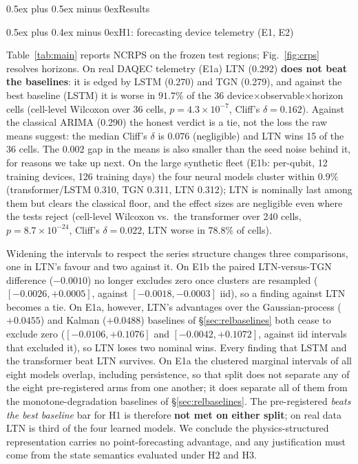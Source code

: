 \documentclass[journal]{IEEEtran}
\makeatletter
\def\section{\@startsection{section}{1}{\z@}{1.8ex plus 1ex minus 0.75ex}%
{0.5ex plus 0.5ex minus 0ex}{\normalfont\normalsize\centering\scshape}}
\def\subsection{\@startsection{subsection}{2}{\z@}{1.8ex plus 1ex minus 0.75ex}%
{0.5ex plus 0.4ex minus 0ex}{\normalfont\normalsize\itshape}}
\makeatother
\begin{document}
\section{Results}\label{sec:results}

\subsection{H1: forecasting device telemetry (E1, E2)}\label{sec:results-h1}

Table~\ref{tab:main} reports NCRPS on the frozen test regions; Fig.~\ref{fig:crps}
resolves horizons. On real DAQEC telemetry (E1a) LTN (0.292) \textbf{does not beat
the baselines}: it is edged by LSTM (0.270) and TGN (0.279), and against the best
baseline (LSTM) it is worse in $91.7\%$ of the 36
device$\times$observable$\times$horizon cells (cell-level Wilcoxon over 36 cells,
$p = 4.3\times10^{-7}$, Cliff's $\delta = 0.162$). Against the classical
ARIMA (0.290) the honest verdict is a tie, not the loss the raw means suggest: the
median Cliff's $\delta$ is $0.076$ (negligible) and LTN wins 15 of the 36 cells. The
$0.002$ gap in the means is also smaller than the seed noise behind it, for reasons
we take up next. On the large synthetic fleet (E1b: per-qubit, 12 training
devices, 126 training days) the four neural models cluster within $0.9\%$
(transformer/LSTM 0.310, TGN 0.311, LTN 0.312); LTN is nominally last among them
but clears the classical floor, and the effect sizes are negligible even where the
tests reject (cell-level Wilcoxon vs.\ the transformer over 240 cells,
$p = 8.7\times10^{-24}$, Cliff's $\delta = 0.022$, LTN worse in $78.8\%$ of cells).

Widening the intervals to respect the series structure changes three comparisons, one
in LTN's favour and two against it. On E1b the paired LTN-versus-TGN difference
($-0.0010$) no longer excludes zero once clusters are resampled ($[-0.0026, +0.0005]$,
against $[-0.0018, -0.0003]$ iid), so a finding against LTN becomes a tie. On E1a,
however, LTN's advantages over the Gaussian-process ($+0.0455$) and Kalman
($+0.0488$) baselines of \S\ref{sec:relbaselines} both cease to exclude zero
($[-0.0106, +0.1076]$ and $[-0.0042, +0.1072]$, against iid intervals that excluded
it), so LTN loses two nominal wins. Every finding that LSTM and the transformer beat
LTN survives. On E1a the clustered marginal intervals of all eight models overlap,
including persistence, so that split does not separate any of the eight pre-registered
arms from one another; it does separate all of them from the monotone-degradation
baselines of \S\ref{sec:relbaselines}. The pre-registered \emph{beats the best baseline} bar for H1 is
therefore \textbf{not met on either split}; on real data LTN is third of the four
learned models. We conclude the physics-structured representation carries no
point-forecasting advantage, and any justification must come from the state
semantics evaluated under H2 and H3.
\end{document}
